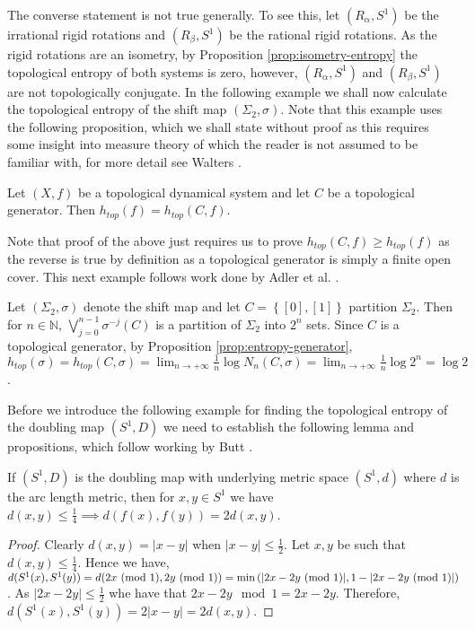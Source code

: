 The converse statement is not true generally. To see this, let $(R_\alpha, S^1)$ be the irrational rigid rotations and $(R_\beta, S^1)$ be the rational rigid rotations. As the rigid rotations are an isometry, by Proposition \ref{prop:isometry-entropy} the topological entropy of both systems is zero, however, $(R_\alpha, S^1)$ and $(R_\beta, S^1)$ are not topologically conjugate. In the following example we shall now calculate the topological entropy of the shift map $(\Sigma_2, \sigma)$. Note that this example uses the following proposition, which we shall state without proof as this requires some insight into measure theory of which the reader is not assumed to be familiar with, for more detail see Walters \cite{walters}.

\begin{prop} \label{prop:entropy-generator}
    Let $(X, f)$ be a topological dynamical system and let $C$ be a topological generator. Then $h_{top}(f) = h_{top}(C, f)$.
\end{prop}

Note that proof of the above just requires us to prove $h_{top}(C, f) \geq h_{top}(f)$ as the reverse is true by definition as a topological generator is simply a finite open cover. This next example follows work done by Adler et al. \cite{adler}.

\begin{exmp} \label{exmp:shift-entropy}
    Let $(\Sigma_2, \sigma)$ denote the shift map and let $C = \left\lbrace [0], [1] \right\rbrace$ partition $\Sigma_2$. Then for $n \in \mathbb{N}$, $\bigvee_{j = 0}^{n - 1}\sigma^{-j}(C)$ is a partition of $\Sigma_2$ into $2^n$ sets. Since $C$ is a topological generator, by Proposition \ref{prop:entropy-generator}, $h_{top}(\sigma) = h_{top}(C, \sigma) = \lim_{n \to +\infty}\frac{1}{n} \log N_n(C, \sigma) = \lim_{n \to +\infty}\frac{1}{n} \log 2^n = \log 2$.
\end{exmp}

Before we introduce the following example for finding the topological entropy of the doubling map $(S^1, D)$ we need to establish the following lemma and propositions, which follow working by Butt \cite{butt}.

\begin{lem} \label{lem:metric-less-quarter}
    If $(S^1, D)$ is the doubling map with underlying metric space $(S^1, d)$ where $d$ is the arc length metric, then for $x, y \in S^1$ we have $d(x, y) \leq \frac{1}{4} \implies d(f(x), f(y)) = 2d(x, y)$.
    \begin{proof}
        Clearly $d(x, y) = |x - y|$ when $|x - y| \leq \frac{1}{2}$. Let $x, y$ be such that $d(x, y) \leq \frac{1}{4}$. Hence we have, $d(S^1(x), S^1(y)) = d(2x \ (\mathrm{mod}\ 1), 2y \ (\mathrm{mod}\ 1)) = \min{(|2x - 2y \ (\mathrm{mod}\ 1)|, 1 - |2x - 2y \ (\mathrm{mod}\ 1)|)}$. As $|2x - 2y| \leq \frac{1}{2}$ whe have that $2x - 2y \mod 1 = 2x - 2y$. Therefore, $d(S^1(x), S^1(y)) = 2|x-y| = 2d(x, y)$.
    \end{proof}
\end{lem}

